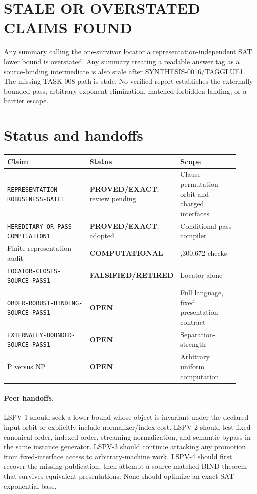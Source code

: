 \documentclass[11pt]{article}
\newcommand{\EXACT}{\textbf{PROVED/EXACT}}
\newcommand{\COMP}{\textbf{COMPUTATIONAL}}
\newcommand{\OPEN}{\textbf{OPEN}}
\newcommand{\RETIRED}{\textbf{FALSIFIED/RETIRED}}
\begin{document}
\section{STALE OR OVERSTATED CLAIMS FOUND}

Any summary calling the one-survivor locator a representation-independent
SAT lower bound is overstated.  Any summary treating a readable answer tag as
a source-binding intermediate is also stale after SYNTHESIS-0016/TAGGLUE1.
The missing TASK-008 path is stale.  No verified report establishes the
externally bounded pass, arbitrary-exponent elimination, matched forbidden
landing, or a barrier escape.

\section{Status and handoffs}

\begin{center}\scriptsize
\begin{tabular}{>{\raggedright\arraybackslash}p{0.40\linewidth}>{\raggedright\arraybackslash}p{0.23\linewidth}>{\raggedright\arraybackslash}p{0.29\linewidth}}
\toprule
Claim & Status & Scope\\ \midrule
\texttt{REPRESENTATION-ROBUSTNESS-GATE1} & \EXACT, review pending &
Clause-permutation orbit and charged interfaces\\
\texttt{HEREDITARY-OR-PASS-COMPILATION1} & \EXACT, adopted &
Conditional pass compiler\\
Finite representation audit & \COMP & 6,300,672 checks\\
\texttt{LOCATOR-CLOSES-SOURCE-PASS1} & \RETIRED & Locator alone\\
\texttt{ORDER-ROBUST-BINDING-SOURCE-PASS1} & \OPEN & Full language,
fixed presentation contract\\
\texttt{EXTERNALLY-BOUNDED-SOURCE-PASS1} & \OPEN & Separation-strength\\
P versus NP & \OPEN & Arbitrary uniform computation\\
\bottomrule
\end{tabular}
\end{center}

\paragraph{Peer handoffs.}
LSPV-1 should seek a lower bound whose object is invariant under the declared
input orbit or explicitly include normalizer/index cost.  LSPV-2 should test
fixed canonical order, indexed order, streaming normalization, and semantic
bypass in the same instance generator.  LSPV-3 should continue attacking any
promotion from fixed-interface access to arbitrary-machine work.  LSPV-4
should first recover the missing publication, then attempt a source-matched
BIND theorem that survives equivalent presentations.  None should optimize
an exact-SAT exponential base.
\end{document}

